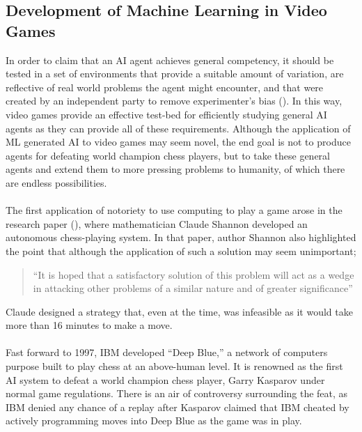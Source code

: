 \subsection{Development of Machine Learning in Video Games}
In order to claim that an AI agent achieves general competency, it should be tested in a set of
environments that provide a suitable amount of variation, are reflective of real world problems the
agent might encounter, and that were created by an independent party to remove experimenter's bias
(\citet{ale-eval-plat}). In this way, video games provide an effective test-bed for efficiently
studying general AI agents as they can provide all of these requirements. Although the application
of ML generated AI to video games may seem novel, the end goal is not to produce agents for
defeating world champion chess players, but to take these general agents and extend them to more
pressing problems to humanity, of which there are endless possibilities. \paragraph{}

The first application of notoriety to use computing to play a game arose in the research paper (\citet{programming-comp-chess}), where
mathematician Claude Shannon developed an autonomous chess-playing system. In that paper, author
Shannon also highlighted the point that although the application of such a solution may seem
unimportant;
\begin{quote}
    ``It is hoped that a satisfactory solution of this problem will act as a wedge in attacking
    other problems of a similar nature and of greater significance''
\end{quote}
Claude designed a strategy that, even at the time, was infeasible as it would take more than 16
minutes to make a move. \paragraph{}

Fast forward to 1997, IBM developed ``Deep Blue,'' a network of computers purpose built to play
chess at an above-human level. It is renowned as the first AI system to defeat a world champion
chess player, Garry Kasparov under normal game regulations. There is an air of controversy
surrounding the feat, as IBM denied any chance of a replay after Kasparov claimed that IBM cheated
by actively programming moves into Deep Blue as the game was in play. \paragraph{}

